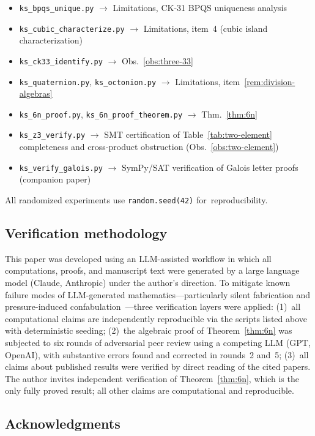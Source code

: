 \documentclass[12pt,a4paper]{article}
\begin{document}
\begin{sloppypar}
\begin{itemize}
\item \texttt{ks\_bpqs\_unique.py} $\to$ Limitations, CK-31 BPQS uniqueness analysis
\item \texttt{ks\_cubic\_characterize.py} $\to$ Limitations, item~4 (cubic island characterization)
\item \texttt{ks\_ck33\_identify.py} $\to$ Obs.~\ref{obs:three-33}
\item \texttt{ks\_quaternion.py}, \texttt{ks\_octonion.py} $\to$ Limitations, item~\ref{rem:division-algebras}
\item \texttt{ks\_6n\_proof.py}, \texttt{ks\_6n\_proof\_theorem.py} $\to$ Thm.~\ref{thm:6n}
\item \texttt{ks\_z3\_verify.py} $\to$ SMT certification of Table~\ref{tab:two-element} completeness and cross-product obstruction (Obs.~\ref{obs:two-element})
\item \texttt{ks\_verify\_galois.py} $\to$ SymPy/SAT verification of Galois letter proofs (companion paper)
\end{itemize}
\end{sloppypar}
All randomized experiments use \texttt{random.seed(42)} for~reproducibility.

\subsection*{Verification methodology}

This paper was developed using an LLM-assisted workflow in which all computations, proofs, and manuscript text were generated by a large language model (Claude, Anthropic) under the author's direction.  To mitigate known failure modes of LLM-generated mathematics---particularly silent fabrication and pressure-induced confabulation~\cite{Schwartz2026}---three verification layers were applied: (1)~all computational claims are independently reproducible via the scripts listed above with deterministic seeding; (2)~the algebraic proof of Theorem~\ref{thm:6n} was subjected to six rounds of adversarial peer review using a competing LLM (GPT, OpenAI), with substantive errors found and corrected in rounds~2 and~5; (3)~all claims about published results were verified by direct reading of the cited papers.  The author invites independent verification of Theorem~\ref{thm:6n}, which is the only fully proved result; all other claims are computational and reproducible.

\subsection*{Acknowledgments}
\end{document}
